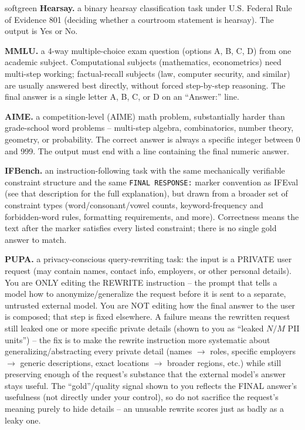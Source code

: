 \documentclass[11pt]{article}
\begin{document}
\begin{promptbox}[title={\textbf{Task descriptions inserted into the system prompt}},fontupper=\small]{softgreen}
\textbf{Hearsay.} a binary hearsay classification task under U.S. Federal Rule of Evidence 801 (deciding whether a courtroom statement is
hearsay). The output is Yes or No.\par
\textbf{MMLU.} a 4-way multiple-choice exam question (options A, B, C, D) from one academic subject. Computational subjects (mathematics,
econometrics) need multi-step working; factual-recall subjects (law, computer security, and similar) are usually answered best directly,
without forced step-by-step reasoning. The final answer is a single letter A, B, C, or D on an ``Answer:'' line.\par
\textbf{AIME.} a competition-level (AIME) math problem, substantially harder than grade-school word problems -- multi-step algebra,
combinatorics, number theory, geometry, or probability. The correct answer is always a specific integer between 0 and 999. The output
must end with a line containing the final numeric answer.\par
\textbf{IFBench.} an instruction-following task with the same mechanically verifiable constraint structure and the same
\texttt{FINAL RESPONSE:} marker convention as IFEval (see that description for the full explanation), but drawn from a broader set of constraint types (word/consonant/vowel counts,
keyword-frequency and forbidden-word rules, formatting requirements, and more). Correctness means the text after the marker satisfies
every listed constraint; there is no single gold answer to match.\par
\textbf{PUPA.} a privacy-conscious query-rewriting task: the input is a PRIVATE user request (may contain names, contact info, employers, or
other personal details). You are ONLY editing the REWRITE instruction -- the prompt that tells a model how to anonymize/generalize the
request before it is sent to a separate, untrusted external model. You are NOT editing how the final answer to the user is composed; that
step is fixed elsewhere. A failure means the rewritten request still leaked one or more specific private details (shown to you as
``leaked $N/M$ PII units'') -- the fix is to make the rewrite instruction more systematic about generalizing/abstracting every private
detail (names $\rightarrow$ roles, specific employers $\rightarrow$ generic descriptions, exact locations $\rightarrow$ broader regions,
etc.) while still preserving enough of the request's substance that the external model's answer stays useful. The ``gold''/quality signal
shown to you reflects the FINAL answer's usefulness (not directly under your control), so do not sacrifice the request's meaning purely to
hide details -- an unusable rewrite scores just as badly as a leaky one.
\end{promptbox}
\end{document}
